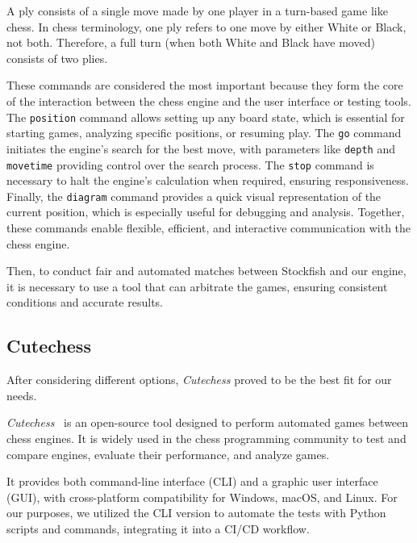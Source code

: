 \noindent A ply consists of a single move made by one player in a turn-based game like chess. In chess terminology, one ply refers to one move by either White or Black, not both. Therefore, a full turn (when both White and Black have moved) consists of two plies.

\vspace{1em}

\noindent These commands are considered the most important because they form the core of the interaction between the chess engine and the user interface or testing tools. The \texttt{position} command allows setting up any board state, which is essential for starting games, analyzing specific positions, or resuming play. The \texttt{go} command initiates the engine's search for the best move, with parameters like \texttt{depth} and \texttt{movetime} providing control over the search process. The \texttt{stop} command is necessary to halt the engine's calculation when required, ensuring responsiveness. Finally, the \texttt{diagram} command provides a quick visual representation of the current position, which is especially useful for debugging and analysis. Together, these commands enable flexible, efficient, and interactive communication with the chess engine.

\vspace{1em}

\noindent Then, to conduct fair and automated matches between Stockfish and our engine, it is necessary to use a tool that can arbitrate the games, ensuring consistent conditions and accurate results.

\subsection*{Cutechess}

\noindent After considering different options, \textit{Cutechess} proved to be the best fit for our needs.

\vspace{1em}

\noindent \textit{Cutechess}~\cite{CuteChess} is an open-source tool designed to perform automated games between chess engines. It is widely used in the chess programming community to test and compare engines, evaluate their performance, and analyze games.

\vspace{1em}

\noindent It provides both command-line interface (CLI) and a graphic user interface (GUI), with cross-platform compatibility for Windows, macOS, and Linux. For our purposes, we utilized the CLI version to automate the tests with Python scripts and commands, integrating it into a CI/CD workflow.

